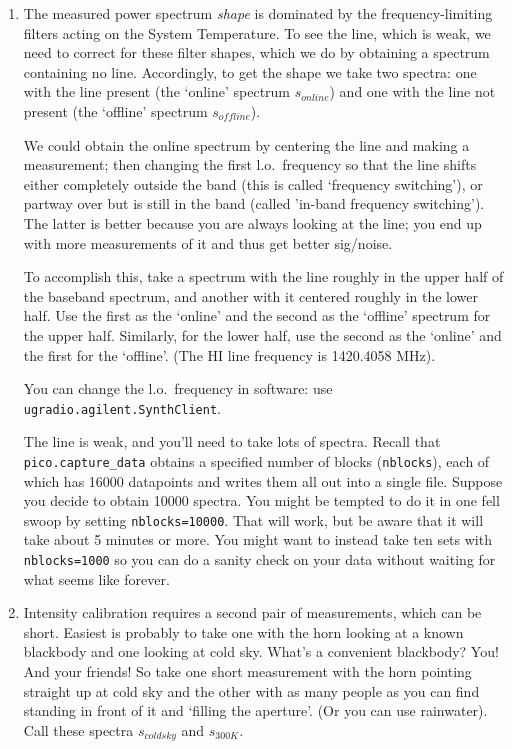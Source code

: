 \documentclass[12pt,preprint]{aastex}
\begin{document}
\begin{enumerate}

\item 
The measured power spectrum {\it shape} is dominated by the
frequency-limiting filters acting on the System Temperature. To see the
line, which is weak, we need to correct for these filter shapes, which
we do by obtaining a spectrum containing no line. Accordingly, to get
the shape we take two spectra: one with the line present (the `online'
spectrum $s_{online}$) and one with the line not present (the `offline'
spectrum $s_{offline}$).

We could obtain the online
  spectrum by centering the line and making a measurement; then changing
  the first l.o.\ frequency so that the line shifts either completely
  outside the band (this is called `frequency switching'), or partway
  over but is still in the band (called 'in-band frequency
  switching'). The latter is better because you are always looking at
  the line; you end up with more measurements of it and thus get better sig/noise.

To accomplish this, take a spectrum with the line roughly in the upper
half of the baseband spectrum, and another with it centered roughly in
the lower half. Use the first as the `online' and the second as the
`offline' spectrum for the upper half. Similarly, for the lower half,
use the second as the `online' and the first for the `offline'.  (The HI
line frequency is 1420.4058 MHz).

You can change the l.o.\ frequency in software: use {\tt ugradio.agilent.SynthClient}. 

The line is weak, and you'll need to take lots of spectra. Recall that
{\tt pico.capture\_data} obtains a specified number of blocks ({\tt nblocks}),
each of which has 16000 datapoints and writes them all out into a single
file. Suppose you decide to obtain 10000 spectra. You might be tempted
to do it in one fell swoop by setting {\tt nblocks=10000}. That
will work, but be aware that it will take about 5 minutes or more. You
might want to instead take ten sets with {\tt nblocks=1000} so you can do a
sanity check on your data without waiting for what seems like forever. 

\item Intensity calibration requires a second pair of measurements,
  which can be short. Easiest is probably to take one with the horn
  looking at a known blackbody and one looking at cold sky. What's a
  convenient blackbody? You! And your friends! So take one short
  measurement with the horn pointing straight up at cold sky and the
  other with as many people as you can find standing in front of it and
  `filling the aperture'. (Or you can use rainwater). Call these spectra
  $s_{coldsky}$ and $s_{300K}$.

\end{enumerate}
\end{document}
